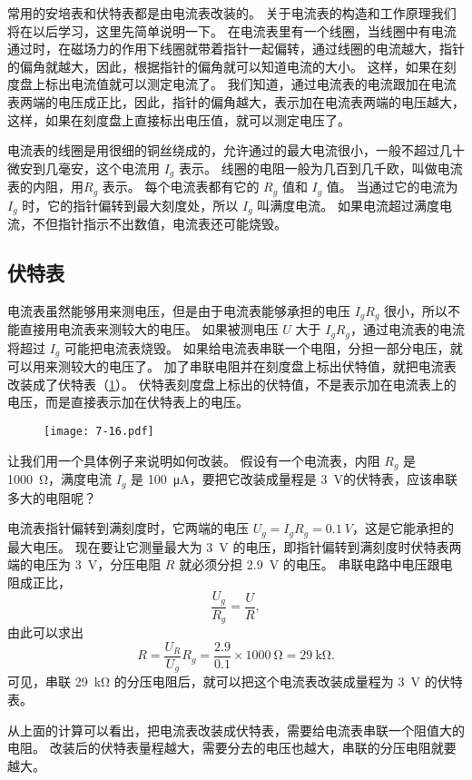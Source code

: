 常用的安培表和伏特表都是由电流表改装的。
关于电流表的构造和工作原理我们将在以后学习，这里先简单说明一下。
在电流表里有一个线圈，当线圈中有电流通过时，在磁场力的作用下线圈就带着指针一起偏转，通过线圈的电流越大，指针的偏角就越大，因此，根据指针的偏角就可以知道电流的大小。
这样，如果在刻度盘上标出电流值就可以测定电流了。
我们知道，通过电流表的电流跟加在电流表两端的电压成正比，因此，指针的偏角越大，表示加在电流表两端的电压越大，这样，如果在刻度盘上直接标出电压值，就可以测定电压了。

电流表的线圈是用很细的铜丝绕成的，允许通过的最大电流很小，一般不超过几十微安到几毫安，这个电流用 $I_g$ 表示。
线圈的电阻一般为几百到几千欧，叫做电流表的内阻，用$R_g$ 表示。
每个电流表都有它的 $R_g$ 值和 $I_g$ 值。
当通过它的电流为 $I_g$ 时，它的指针偏转到最大刻度处，所以 $I_g$ 叫满度电流。
如果电流超过满度电流，不但指针指示不出数值，电流表还可能烧毁。

\subsection{伏特表}
电流表虽然能够用来测电压，但是由于电流表能够承担的电压 $I_gR_g$ 很小，所以不能直接用电流表来测较大的电压。
如果被测电压 $U$ 大于 $I_gR_g$，通过电流表的电流将超过 $I_g$ 可能把电流表烧毁。
如果给电流表串联一个电阻，分担一部分电压，就可以用来测较大的电压了。
加了串联电阻并在刻度盘上标出伏特值，就把电流表改装成了伏特表（\cref{fig:7-16}）。
伏特表刻度盘上标出的伏特值，不是表示加在电流表上的电压，而是直接表示加在伏特表上的电压。
\begin{figure}
  \texttt{[image: 7-16.pdf]}
  \caption{}\label{fig:7-16}
\end{figure}	

让我们用一个具体例子来说明如何改装。
假设有一个电流表，内阻 $R_g$ 是 \qty{1000}{\ohm}，满度电流 $I_g$ 是 \qty{100}{\micro A}，要把它改装成量程是 \qty{3}{V}的伏特表，应该串联多大的电阻呢？

电流表指针偏转到满刻度时，它两端的电压 $U_g=I_gR_g=\qty{0.1}{V}$，这是它能承担的最大电压。
现在要让它测量最大为 \qty{3}{V} 的电压，即指针偏转到满刻度时伏特表两端的电压为 \qty{3}{V}，分压电阻 $R$ 就必须分担 \qty{2.9}{V} 的电压。
串联电路中电压跟电阻成正比，
\[\frac{U_g}{R_g}=\frac{U}{R},\]
由此可以求出
\[R=\frac{U_R}{U_g}R_g=\frac{2.9}{0.1}\times \qty{1000}{\ohm}=\qty{29}{\kilo\ohm}.\]
可见，串联 \qty{29}{\kilo\ohm} 的分压电阻后，就可以把这个电流表改装成量程为 \qty{3}{V} 的伏特表。

从上面的计算可以看出，把电流表改装成伏特表，需要给电流表串联一个阻值大的电阻。
改装后的伏特表量程越大，需要分去的电压也越大，串联的分压电阻就要越大。

